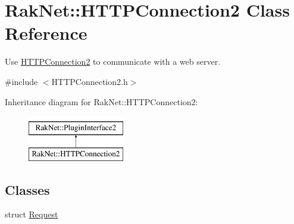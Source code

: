 \hypertarget{class_rak_net_1_1_h_t_t_p_connection2}{\section{Rak\-Net\-:\-:H\-T\-T\-P\-Connection2 Class Reference}
\label{class_rak_net_1_1_h_t_t_p_connection2}
}


Use \hyperlink{class_rak_net_1_1_h_t_t_p_connection2}{H\-T\-T\-P\-Connection2} to communicate with a web server.  




{\ttfamily \#include $<$H\-T\-T\-P\-Connection2.\-h$>$}

Inheritance diagram for Rak\-Net\-:\-:H\-T\-T\-P\-Connection2\-:\begin{figure}[H]
\begin{center}
\leavevmode
\includegraphics[height=2.000000cm]{class_rak_net_1_1_h_t_t_p_connection2}
\end{center}
\end{figure}
\subsection*{Classes}
\begin{DoxyCompactItemize}
\item 
struct \hyperlink{struct_rak_net_1_1_h_t_t_p_connection2_1_1_request}{Request}
\end{DoxyCompactItemize}
